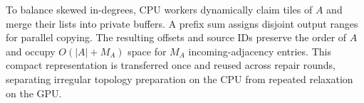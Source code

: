 To balance skewed in-degrees, CPU workers dynamically claim tiles of $A$ and merge their lists into private buffers. A prefix sum assigns disjoint output ranges for parallel copying. The resulting offsets and source IDs preserve the order of $A$ and occupy $O(|A|+M_A)$ space for $M_A$ incoming-adjacency entries. This compact representation is transferred once and reused across repair rounds, separating irregular topology preparation on the CPU from repeated relaxation on the GPU.






